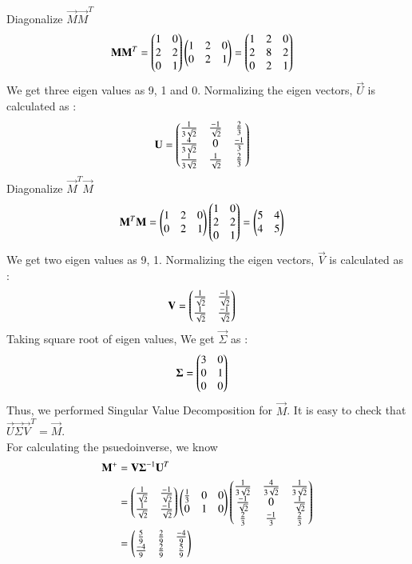 \documentclass[journal,12pt,twocolumn]{IEEEtran}
\begin{document}
Diagonalize $\vec{M}\vec{M}^T$
\begin{align}
	\label{eq12}\mathbf{M}\mathbf{M}^T &= \begin{pmatrix}1 & 0\\2 & 2\\0 & 1\end{pmatrix} \begin{pmatrix}1 & 2 & 0\\0 & 2 & 1\end{pmatrix} = \begin{pmatrix}1 & 2 & 0\\2 & 8 & 2\\ 0 & 2 & 1\end{pmatrix} 
\end{align}
We get three eigen values as 9, 1 and 0. Normalizing the eigen vectors, $\vec{U}$ is calculated as : 
\begin{align}
	\mathbf{U} &= \begin{pmatrix}\frac{1}{3\sqrt{2}} & \frac{-1}{\sqrt{2}} & \frac{2}{3} \\ \frac{4}{3\sqrt{2}} & 0 & \frac{-1}{3} \\ \frac{1}{3\sqrt{2}} & \frac{1}{\sqrt{2}} & \frac{2}{3}\end{pmatrix}  
\end{align}
Diagonalize $\vec{M}^T\vec{M}$
\begin{align}
	\label{e14}\mathbf{M}^T\mathbf{M} &= \begin{pmatrix}1 & 2 & 0\\0 & 2 & 1\end{pmatrix}\begin{pmatrix}1 & 0\\2 & 2\\0 & 1\end{pmatrix} = \begin{pmatrix}5 & 4\\4 & 5\end{pmatrix}
\end{align}
We get two eigen values as 9, 1. Normalizing the eigen vectors, $\vec{V}$ is calculated as : 
\begin{align}
	\mathbf{V} &= \begin{pmatrix}\frac{1}{\sqrt{2}} & \frac{-1}{\sqrt{2}} \\
	\frac{1}{\sqrt{2}} & \frac{-1}{\sqrt{2}}\end{pmatrix}  
\end{align}
Taking square root of eigen values, We get $\vec{\Sigma}$ as :
\begin{align}
	\mathbf{\Sigma} &= \begin{pmatrix}3 & 0\\0 & 1\\0 & 0\end{pmatrix}
\end{align}
Thus, we performed Singular Value Decomposition for $\vec{M}$. It is easy to check that $\vec{U}\vec{\Sigma}\vec{V}^T = \vec{M}$. \\
For calculating the psuedoinverse, we know 
\begin{align}
\mathbf{M}^{+} &= \mathbf{V}\mathbf{\Sigma}^{-1}\mathbf{U}^T \\
&= \begin{pmatrix}\frac{1}{\sqrt{2}} & \frac{-1}{\sqrt{2}} \\
	\frac{1}{\sqrt{2}} & \frac{-1}{\sqrt{2}}\end{pmatrix} \begin{pmatrix}\frac{1}{3} & 0 & 0 \\ 0 & 1 & 0\end{pmatrix} \begin{pmatrix}\frac{1}{3\sqrt{2}} & \frac{4}{3\sqrt{2}} & \frac{1}{3\sqrt{2}} \\ \frac{-1}{\sqrt{2}} & 0 &  \frac{1}{\sqrt{2}} \\  \frac{2}{3} & \frac{-1}{3} & \frac{2}{3}\end{pmatrix}\\
&= \label{eq20}\begin{pmatrix}\frac{5}{9} & \frac{2}{9} & \frac{-4}{9} \\ \frac{-4}{9} & \frac{2}{9} & \frac{5}{9}\end{pmatrix}
\end{align}
\end{document}
